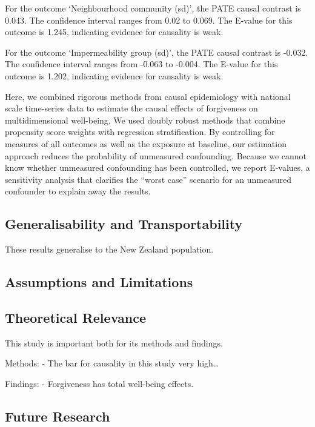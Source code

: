 \documentclass[
  singlecolumn]{report}
\begin{document}
For the outcome `Neighbourhood community (sd)', the PATE causal contrast
is 0.043. The confidence interval ranges from 0.02 to 0.069. The E-value
for this outcome is 1.245, indicating evidence for causality is weak.

For the outcome `Impermeability group (sd)', the PATE causal contrast is
-0.032. The confidence interval ranges from -0.063 to -0.004. The
E-value for this outcome is 1.202, indicating evidence for causality is
weak.

Here, we combined rigorous methods from causal epidemiology with
national scale time-series data to estimate the causal effects of
forgiveness on multidimensional well-being. We used doubly robust
methods that combine propensity score weights with regression
stratification. By controlling for measures of all outcomes as well as
the exposure at baseline, our estimation approach reduces the
probability of unmeasured confounding. Because we cannot know whether
unmeasured confounding has been controlled, we report E-values, a
sensitivity analysis that clarifies the ``worst case'' scenario for an
unmeasured confounder to explain away the results.

\hypertarget{generalisability-and-transportability}{%
\subsection{Generalisability and
Transportability}\label{generalisability-and-transportability}}

These results generalise to the New Zealand population.

\hypertarget{assumptions-and-limitations}{%
\subsection{Assumptions and
Limitations}\label{assumptions-and-limitations}}

\hypertarget{theoretical-relevance}{%
\subsection{Theoretical Relevance}\label{theoretical-relevance}}

This study is important both for its methods and findings.

Methods: - The bar for causality in this study very high\ldots{}

Findings: - Forgiveness has total well-being effects.

\hypertarget{future-research}{%
\subsection{Future Research}\label{future-research}}
\end{document}
